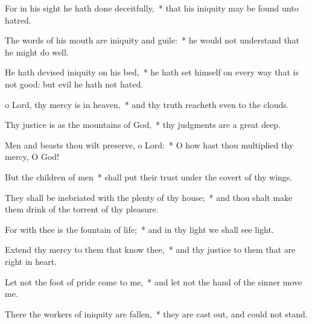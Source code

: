 \begin{enpars}
\item For in his sight he hath done deceitfully,~* that his iniquity may be found unto hatred.
\item The words of his mouth are iniquity and guile:~* he would not understand that he might do well.
\item He hath devised iniquity on his bed,~* he hath set himself on every way that is not good: but evil he hath not hated.
\item o Lord, thy mercy is in heaven,~* and thy truth reacheth even to the clouds.
\item Thy justice is as the mountains of God,~* thy judgments are a great deep.
\item Men and beasts thou wilt preserve, o Lord:~* O how hast thou multiplied thy mercy, O God!
\item But the children of men~* shall put their trust under the covert of thy wings.
\item They shall be inebriated with the plenty of thy house;~* and thou shalt make them drink of the torrent of thy pleasure.
\item For with thee is the fountain of life;~* and in thy light we shall see light.
\item Extend thy mercy to them that know thee,~* and thy justice to them that are right in heart.
\item Let not the foot of pride come to me,~* and let not the hand of the sinner move me.
\item There the workers of iniquity are fallen,~* they are cast out, and could not stand.
\end{enpars}